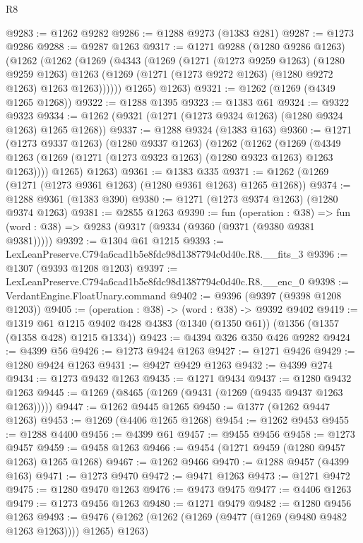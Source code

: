 \begin{lexlean}{R8}
\begin{coremodule}
@9283 := @1262 @9282
@9286 := @1288 @9273 (@1383 @281)
@9287 := @1273 @9286
@9288 := @9287 @1263
@9317 := @1271
    @9288
    (@1280 @9286 @1263)
    (@1262
      (@1262
        (@1269
          (@4343
            (@1269
              (@1271
                (@1273 @9259 @1263)
                (@1280 @9259 @1263)
                @1263
                (@1269 (@1271 (@1273 @9272 @1263) (@1280 @9272 @1263) @1263 @1263))))))
        @1265)
      @1263)
@9321 := @1262 (@1269 (@4349 @1265 @1268))
@9322 := @1288 @1395
@9323 := @1383 @61
@9324 := @9322 @9323
@9334 := @1262 (@9321 (@1271 (@1273 @9324 @1263) (@1280 @9324 @1263) @1265 @1268))
@9337 := @1288 @9324 (@1383 @163)
@9360 := @1271
    (@1273 @9337 @1263)
    (@1280 @9337 @1263)
    (@1262
      (@1262
        (@1269 (@4349 @1263 (@1269 (@1271 (@1273 @9323 @1263) (@1280 @9323 @1263) @1263 @1263))))
        @1265)
      @1263)
@9361 := @1383 @335
@9371 := @1262 (@1269 (@1271 (@1273 @9361 @1263) (@1280 @9361 @1263) @1265 @1268))
@9374 := @1288 @9361 (@1383 @390)
@9380 := @1271 (@1273 @9374 @1263) (@1280 @9374 @1263)
@9381 := @2855 @1263
@9390 := fun (operation : @38) =>
  fun (word : @38) => @9283 (@9317 (@9334 (@9360 (@9371 (@9380 @9381 @9381)))))
@9392 := @1304 @61 @1215
@9393 := LexLeanPreserve.C794a6cad1b5e8fdc98d1387794c0d40c.R8.__fits_3
@9396 := @1307 (@9393 @1208 @1203)
@9397 := LexLeanPreserve.C794a6cad1b5e8fdc98d1387794c0d40c.R8.__enc_0
@9398 := VerdantEngine.FloatUnary.command
@9402 := @9396 (@9397 (@9398 @1208 @1203))
@9405 := (operation : @38) -> (word : @38) -> @9392 @9402
@9419 := @1319
    @61
    @1215
    @9402
    @428
    @4383
    (@1340 (@1350 @61))
    (@1356 (@1357 (@1358 @428) @1215 @1334))
@9423 := @4394 @326 @350 @426 @9282
@9424 := @4399 @56
@9426 := @1273 @9424 @1263
@9427 := @1271 @9426
@9429 := @1280 @9424 @1263
@9431 := @9427 @9429 @1263
@9432 := @4399 @274
@9434 := @1273 @9432 @1263
@9435 := @1271 @9434
@9437 := @1280 @9432 @1263
@9445 := @1269 (@8465 (@1269 (@9431 (@1269 (@9435 @9437 @1263 @1263)))))
@9447 := @1262 @9445 @1265
@9450 := @1377 (@1262 @9447 @1263)
@9453 := @1269 (@4406 @1265 @1268)
@9454 := @1262 @9453
@9455 := @1288 @4400
@9456 := @4399 @61
@9457 := @9455 @9456
@9458 := @1273 @9457
@9459 := @9458 @1263
@9466 := @9454 (@1271 @9459 (@1280 @9457 @1263) @1265 @1268)
@9467 := @1262 @9466
@9470 := @1288 @9457 (@4399 @163)
@9471 := @1273 @9470
@9472 := @9471 @1263
@9473 := @1271 @9472
@9475 := @1280 @9470 @1263
@9476 := @9473 @9475
@9477 := @4406 @1263
@9479 := @1273 @9456 @1263
@9480 := @1271 @9479
@9482 := @1280 @9456 @1263
@9493 := @9476 (@1262 (@1262 (@1269 (@9477 (@1269 (@9480 @9482 @1263 @1263)))) @1265) @1263)

\end{coremodule}
\end{lexlean}
